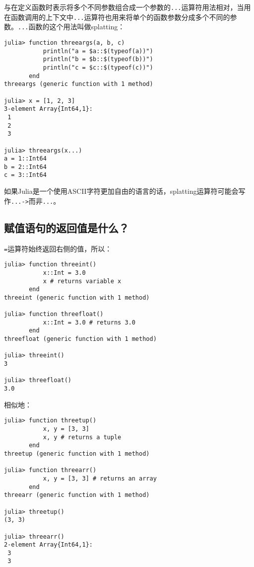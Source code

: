 与在定义函数时表示将多个不同参数组合成一个参数的\texttt{...}运算符用法相对，当用在函数调用的上下文中\texttt{...}运算符也用来将单个的函数参数分成多个不同的参数。\texttt{...}函数的这个用法叫做splatting：




\begin{verbatim}
julia> function threeargs(a, b, c)
           println("a = $a::$(typeof(a))")
           println("b = $b::$(typeof(b))")
           println("c = $c::$(typeof(c))")
       end
threeargs (generic function with 1 method)

julia> x = [1, 2, 3]
3-element Array{Int64,1}:
 1
 2
 3

julia> threeargs(x...)
a = 1::Int64
b = 2::Int64
c = 3::Int64
\end{verbatim}



如果Julia是一个使用ASCII字符更加自由的语言的话，splatting运算符可能会写作\texttt{...->}而非\texttt{...}。



\hypertarget{18313029058103158138}{}


\subsection{赋值语句的返回值是什么？}



\texttt{=}运算符始终返回右侧的值，所以：




\begin{verbatim}
julia> function threeint()
           x::Int = 3.0
           x # returns variable x
       end
threeint (generic function with 1 method)

julia> function threefloat()
           x::Int = 3.0 # returns 3.0
       end
threefloat (generic function with 1 method)

julia> threeint()
3

julia> threefloat()
3.0
\end{verbatim}



相似地：




\begin{verbatim}
julia> function threetup()
           x, y = [3, 3]
           x, y # returns a tuple
       end
threetup (generic function with 1 method)

julia> function threearr()
           x, y = [3, 3] # returns an array
       end
threearr (generic function with 1 method)

julia> threetup()
(3, 3)

julia> threearr()
2-element Array{Int64,1}:
 3
 3
\end{verbatim}




